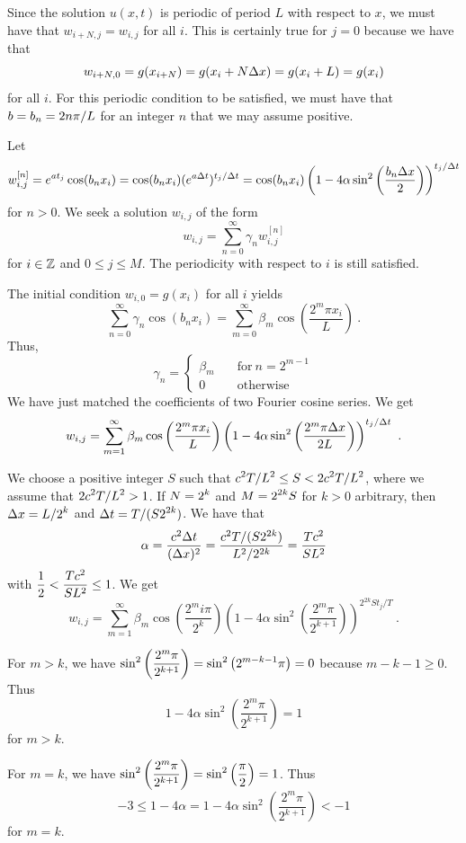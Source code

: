 \begin{egg}
Since the solution $u(x,t)$ is periodic of period $L$ with respect to $x$, we
must have that $w_{i+N,j} = w_{i,j}$ for all $i$.  This is certainly
true for $j=0$ because we have that
\[
  w_{i+N,0} = g(x_{i+N}) = g(x_i + N\Delta{x}) = g(x_i+L) = g(x_i)
\]
for all $i$.  For this periodic condition to be satisfied, we must
have that $\displaystyle b = b_n = 2n\pi/L$ for an integer $n$ that we
may assume positive.

Let
\[
w_{i,j}^{[n]} = e^{at_j}\cos(b_n x_i)
= \cos(b_n x_i) (e^{a\Delta{t}})^{t_j/\Delta{t}} = \cos(b_n x_i)
\left(1 - 4\alpha \sin^2\left(\frac{b_n\Delta{x}}{2}\right)\right)^{t_j/\Delta{t}}
\]
for $n>0$.  We seek a solution $w_{i,j}$ of the form
\[
w_{i,j} = \sum_{n=0}^\infty \gamma_n w_{i,j}^{[n]}
\]
for $i \in \mathbb{Z}$ and $0 \leq j \leq M$.  The periodicity with respect
to $i$ is still satisfied.

The initial condition $w_{i,0} = g(x_i)$ for all $i$ yields
\[
\sum_{n=0}^\infty \gamma_n \cos(b_n x_i) =
\sum_{m=0}^\infty \beta_m \cos\left(\frac{2^m \pi x_i}{L}\right) \ .
\]
Thus,
\[
\gamma_n = \begin{cases} \beta_m & \quad \text{for} \ n = 2^{m-1} \\
0 & \quad \text{otherwise}
\end{cases}
\]
We have just matched the coefficients of two Fourier cosine series.
We get
\[
w_{i,j} = \sum_{m=1}^\infty \beta_m
\cos\left(\frac{2^m\pi x_i}{L}\right)
\left(1  - 4\alpha \sin^2\left(\frac{2^m \pi \Delta{x}}{2L}\right)
\right)^{t_j/\Delta{t}} \ .
\]

We choose a positive integer $S$ such that
$\displaystyle c^2T/L^2\leq S < 2c^2T/L^2$, where we
assume that $\displaystyle 2c^2 T/ L^2 > 1$.
If $\displaystyle N = 2^k$ and $\displaystyle M= 2^{2k}S$ for $k>0$
arbitrary, then $\displaystyle \Delta{x} = L/2^k$ and
$\displaystyle \Delta{t} = T/(S2^{2k})$.  We have that
\[
\alpha = \frac{c^2\Delta{t}}{(\Delta{x})^2}
= \frac{ c^2 T /(S2^{2k})}{L^2/2^{2k}}
= \frac{T c^2}{S L^2} 
\]
with
$\displaystyle \frac{1}{2} <  \frac{T c^2}{SL^2} \leq 1$.
We get
\[
w_{i,j} = \sum_{m=1}^\infty \beta_m
\cos\left( \frac{ 2^m i \pi}{2^k}\right)
\left(1 - 4\alpha \sin^2\left( \frac{2^m\pi}{2^{k+1}} \right)
\right)^{2^{2k} S t_j/T} \ .
\]

For $m > k$, we have
$\displaystyle \sin^2\left( \frac{2^m\pi}{2^{k+1}} \right)
= \sin^2\left( 2^{m-k-1}\pi\right) = 0$
because $m - k -1 \geq 0$.  Thus
\[
  1 - 4\alpha \sin^2\left( \frac{2^m\pi}{2^{k+1}}\right) =1
\]
for $m > k$.

For $m = k$, we have
$\displaystyle  \sin^2\left( \frac{2^m\pi}{2^{k+1}} \right)
= \sin^2\left( \frac{\pi}{2}\right) = 1$.  Thus
\[
-3 \leq  1 - 4 \alpha = 1 - 4\alpha \sin^2\left(
    \frac{2^m\pi}{2^{k+1}}\right) < -1
\]
for $m = k$.


\end{egg}
